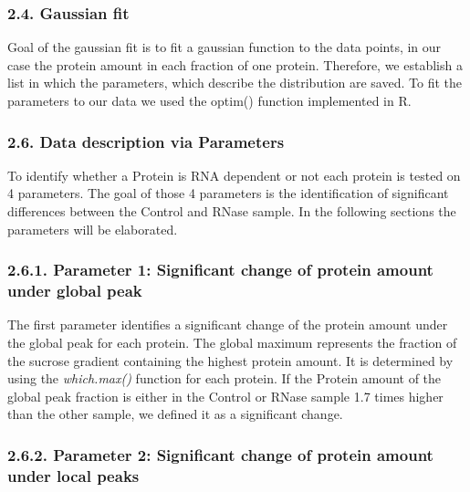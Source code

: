 \documentclass[
  12pt,
]{article}
\begin{document}
\hypertarget{gaussian-fit}{%
\subsubsection{2.4. Gaussian fit}\label{gaussian-fit}}

Goal of the gaussian fit is to fit a gaussian function to the data
points, in our case the protein amount in each fraction of one protein.
Therefore, we establish a list in which the parameters, which describe
the distribution are saved. To fit the parameters to our data we used
the optim() function implemented in R.

\hypertarget{data-description-via-parameters}{%
\subsubsection{2.6. Data description via
Parameters}\label{data-description-via-parameters}}

To identify whether a Protein is RNA dependent or not each protein is
tested on 4 parameters. The goal of those 4 parameters is the
identification of significant differences between the Control and RNase
sample. In the following sections the parameters will be elaborated.

\hypertarget{parameter-1-significant-change-of-protein-amount-under-global-peak}{%
\subsubsection{2.6.1. Parameter 1: Significant change of protein amount
under global
peak}\label{parameter-1-significant-change-of-protein-amount-under-global-peak}}

The first parameter identifies a significant change of the protein
amount under the global peak for each protein. The global maximum
represents the fraction of the sucrose gradient containing the highest
protein amount. It is determined by using the \emph{which.max()}
function for each protein. If the Protein amount of the global peak
fraction is either in the Control or RNase sample 1.7 times higher than
the other sample, we defined it as a significant change.

\hypertarget{parameter-2-significant-change-of-protein-amount-under-local-peaks}{%
\subsubsection{2.6.2. Parameter 2: Significant change of protein amount
under local
peaks}\label{parameter-2-significant-change-of-protein-amount-under-local-peaks}}
\end{document}

